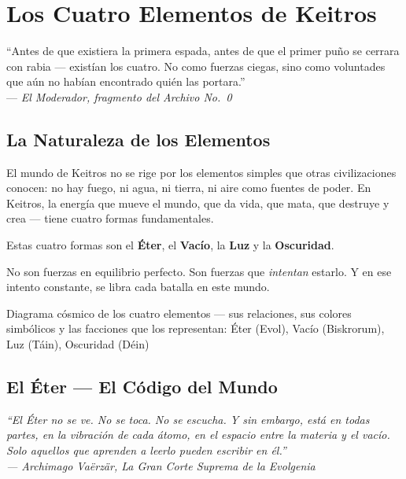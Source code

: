 
\chapter{Los Cuatro Elementos de Keitros}

\begin{loreblock}
``Antes de que existiera la primera espada, antes de que el primer puño se cerrara con rabia — existían los cuatro. No como fuerzas ciegas, sino como voluntades que aún no habían encontrado quién las portara.''\\[4pt]
\hfill — \textit{El Moderador, fragmento del Archivo No.~0}
\end{loreblock}

\vspace{0.4cm}

\section{La Naturaleza de los Elementos}

El mundo de Keitros no se rige por los elementos simples que otras civilizaciones conocen: no hay fuego, ni agua, ni tierra, ni aire como fuentes de poder. En Keitros, la energía que mueve el mundo, que da vida, que mata, que destruye y crea — tiene cuatro formas fundamentales.

Estas cuatro formas son el \textbf{Éter}, el \textbf{Vacío}, la \textbf{Luz} y la \textbf{Oscuridad}.

No son fuerzas en equilibrio perfecto. Son fuerzas que \textit{intentan} estarlo. Y en ese intento constante, se libra cada batalla en este mundo.

\begin{imagebox}{Diagrama cósmico de los cuatro elementos — sus relaciones, sus colores simbólicos y las facciones que los representan: Éter (Evol), Vacío (Biskrorum), Luz (Táin), Oscuridad (Déin)}
    \vspace{4cm}
\end{imagebox}

\section{El Éter — El Código del Mundo}

\begin{tcolorbox}[enhanced, colback=DeepBlack!85, colframe=GoldRule,
    title={\color{GoldRule}\textbf{EL ÉTER}},
    fonttitle=\large\bfseries,
    attach boxed title to top left={xshift=4mm, yshift=-2mm},
    boxed title style={colback=DeepBlack, colframe=GoldRule}]
    \color{white}
    \itshape
    ``El Éter no se ve. No se toca. No se escucha. Y sin embargo, está en todas partes, en la vibración de cada átomo, en el espacio entre la materia y el vacío. Solo aquellos que aprenden a leerlo pueden escribir en él.''\\[4pt]
    \hfill — \textit{Archimago Vaërzär, La Gran Corte Suprema de la Evolgenia}
\end{tcolorbox}

